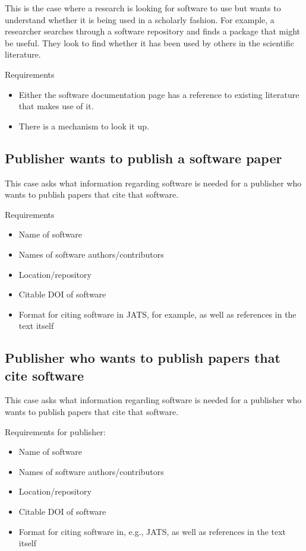 \documentclass[12pt, oneside]{amsart}
\begin{document}
This is the case where a research is looking for software to use but wants to understand whether it is being used in a scholarly fashion.
For example, a researcher searches through a software repository and finds a package that might be useful.
They look to find whether it has been used by others in the scientific literature.

Requirements
\begin{itemize}
\item Either the software documentation page has a reference to existing literature that makes use of it.
\item There is a mechanism to look it up.
\end{itemize}

\subsection{Publisher wants to publish a software paper}

This case asks what information regarding software is needed for a publisher who wants to publish papers that cite that software.

Requirements
\begin{itemize}
\item Name of software
\item Names of software authors/contributors
\item Location/repository
\item Citable DOI of software
\item Format for citing software in JATS, for example, as well as references in the text itself
\end{itemize}

\subsection{Publisher who wants to publish papers that cite software}

This case asks what information regarding software is needed for a publisher who wants to publish papers that cite that software.

Requirements for publisher:
\begin{itemize}
\item Name of software
\item Names of software authors/contributors
\item Location/repository
\item Citable DOI of software
\item Format for citing software in, e.g., JATS, as well as references in the text itself
\end{itemize}
\end{document}
